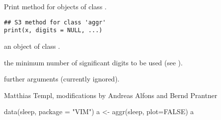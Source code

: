 %
\begin{Description}\relax
Print method for objects of class .
\end{Description}
%
\begin{Usage}
\begin{verbatim}
## S3 method for class 'aggr'
print(x, digits = NULL, ...)
\end{verbatim}
\end{Usage}
%
\begin{Arguments}
\begin{ldescription}
\item[\code{x}] an object of class .
\item[\code{digits}] the minimum number of significant digits to be used (see 
).
\item[\code{...}] further arguments (currently ignored).
\end{ldescription}
\end{Arguments}
%
\begin{Author}\relax
Matthias Templ, modifications by Andreas Alfons and Bernd Prantner
\end{Author}
%
\begin{SeeAlso}\relax
{}
\end{SeeAlso}
%
\begin{Examples}
\begin{ExampleCode}
data(sleep, package = "VIM")
a <- aggr(sleep, plot=FALSE)
a
\end{ExampleCode}
\end{Examples}
